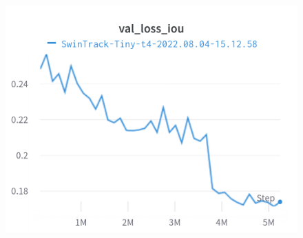\documentclass{article}
\begin{document}
\begin{figure}[h]
\includegraphics[width=\linewidth]{charts/Section-2-Panel-2-owiohngs7}
\caption{}
\endminipage\hfill
\end{figure}
\end{document}
